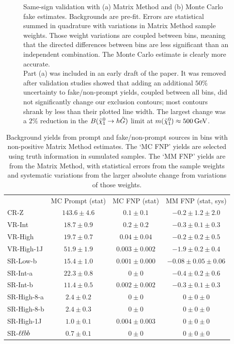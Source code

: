 \begin{figure}[tp]
\begin{subfigure}{0.48\textwidth}
\caption{}
\end{subfigure}
\caption[
Same-sign validation with Matrix Method and Monte Carlo fake estimates
]{%
Same-sign validation with (a) Matrix Method and (b) Monte Carlo fake estimates.
Backgrounds are pre-fit.
Errors are statistical summed in quadrature with variations in Matrix Method
sample weights.
Those weight variations are coupled between bins, meaning that the
directed differences between bins are less significant than an independent
combination.
The Monte Carlo estimate is clearly more accurate.
\\[0.5em]
Part (a) was included in an early draft of the paper.
It was removed after validation studies showed that adding an additional
$50\%$ uncertainty to fake/non-prompt yields, coupled between all bins, did not
significantly change our exclusion contours;
most contours shrank by less than their plotted line width.
The largest change was a $2\%$ reduction in the
$B(\neutralino_1 \rightarrow h \gravitino)$
limit at $m(\neutralino_1) \approx 500\,\eV[G]$.
}
\label{fig:2ljets_vrss}
\end{figure}

\begin{table}[tp]
\centering
\begin{tabular}{lccc}
& MC Prompt (stat) & MC FNP (stat) & MM FNP (stat, sys)
\\[0.5em]
CR-Z & $143.6 \pm 4.6$ & $0.1 \pm 0.1$ & $-0.2 \pm 1.2 \pm 2.0$
\\
VR-Int & $18.7 \pm 0.9$ & $0.2 \pm 0.2$ & $-0.3 \pm 0.1 \pm 0.3$
\\
VR-High & $19.7 \pm 0.7$ & $0.04 \pm 0.04$ & $-0.2 \pm 0.2 \pm 0.5$
\\
VR-High-1J & $51.9 \pm 1.9$ & $0.003 \pm 0.002$ & $-1.9 \pm 0.2 \pm 0.4$
\\
SR-Low-b & $15.4 \pm 1.0$ & $0.001 \pm 0.000$ & $-0.08 \pm 0.05 \pm 0.06$
\\
SR-Int-a & $22.3 \pm 0.8$ & $0 \pm 0$ & $-0.4 \pm 0.2 \pm 0.6$
\\
SR-Int-b & $11.4 \pm 0.5$ & $0.002 \pm 0.002$ & $-0.3 \pm 0.1 \pm 0.3$
\\
SR-High-8-a & $2.4 \pm 0.2$ & $0 \pm 0$ & $0 \pm 0 \pm 0$
\\
SR-High-8-b & $2.4 \pm 0.3$ & $0 \pm 0$ & $0 \pm 0 \pm 0$
\\
SR-High-1J & $1.0 \pm 0.1$ & $0.004 \pm 0.003$ & $0 \pm 0 \pm 0$
\\
SR-$\llbb$ & $0.7 \pm 0.1$ & $0 \pm 0$ & $0 \pm 0 \pm 0$
\\
\end{tabular}
\caption[%
Background yields from prompt and fake/non-prompt sources in bins with
non-positive Matrix Method estimates
]{%
Background yields from prompt and fake/non-prompt sources in bins with
non-positive Matrix Method estimates.
The `MC FNP' yields are selected using truth information in sumulated samples.
The `MM FNP' yields are from the Matrix Method, with statistical errors from
the sample weights and systematic variations from the larger absolute change
from variations of those weights.
}
\label{tab:2ljets_fnp_negative_mm}
\end{table}

